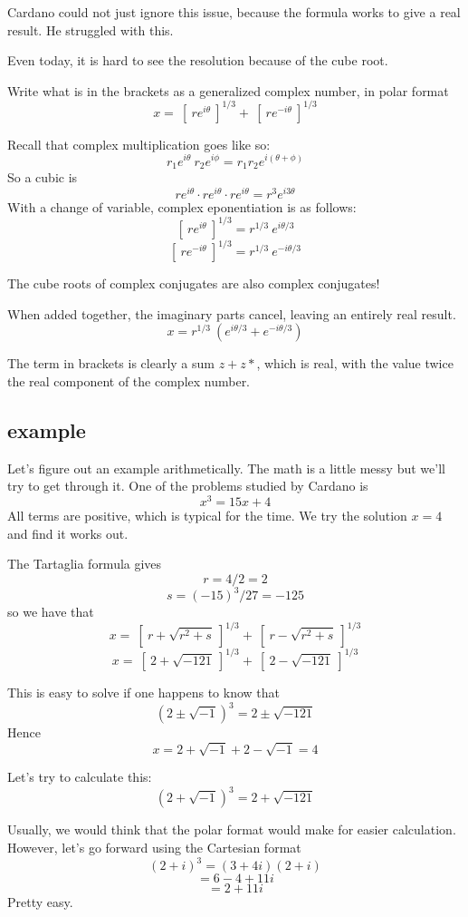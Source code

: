 \documentclass[11pt, oneside]{article}
\begin{document}
Cardano could not just ignore this issue, because the formula works to give a real result.  He struggled with this.  

Even today, it is hard to see the resolution because of the cube root.

Write what is in the brackets as a generalized complex number, in polar format
\[ x = \ [ \ re^{i\theta} \ ]^{1/3} + \ [ \ re^{-i\theta} \ ]^{1/3} \]

Recall that complex multiplication goes like so:
\[ r_1 e^{i\theta} \ r_2 e^{i\phi} = r_1 r_2 e^{i (\theta + \phi)} \]
So a cubic is
\[ r e^{i\theta} \cdot r e^{i\theta} \cdot r e^{i\theta} = r^3 e^{i3\theta}  \]
With a change of variable, complex eponentiation is as follows:
\[ [ \ re^{i\theta} \ ]^{1/3} = r^{1/3} \ e^{i \theta/3} \]
\[ [ \ re^{-i\theta} \ ]^{1/3} = r^{1/3} \ e^{-i \theta/3} \]

The cube roots of complex conjugates are also complex conjugates!

When added together, the imaginary parts cancel, leaving an entirely real result.
\[ x = r^{1/3} \  (e^{i \theta/3} + e^{-i \theta/3}) \]

The term in brackets is clearly a sum $z + z*$, which is real, with the value twice the real component of the complex number.

\subsection*{example}
Let's figure out an example arithmetically.  The math is a little messy but we'll try to get through it.  One of the problems studied by Cardano is
\[ x^3 = 15x + 4 \]
All terms are positive, which is typical for the time.  We try the solution $x = 4$ and find it works out.  

The Tartaglia formula gives
\[ r = 4/2 = 2 \]
\[ s = (-15)^3 / 27 = -125 \]
so we have that
\[ x = \ [ \ r + \sqrt{r^2 + s} \ ]^{1/3} + \ [ \ r - \sqrt{r^2 + s} \ ]^{1/3} \]
\[ x = \ [ \ 2 + \sqrt{-121} \ ]^{1/3} + \ [ \ 2 - \sqrt{-121} \ ]^{1/3} \]

This is easy to solve if one happens to know that
\[ (2 \pm \sqrt{-1})^3 = 2 \pm \sqrt{-121} \]
Hence 
\[ x = 2 + \sqrt{-1} + 2 - \sqrt{-1} = 4 \]

Let's try to calculate this:
\[ (2 + \sqrt{-1})^3 = 2 + \sqrt{-121} \]

Usually, we would think that the polar format would make for easier calculation.  However, let's go forward using the Cartesian format
\[ (2 + i)^3 = (3 + 4i)(2 + i) \]
\[ = 6 - 4 + 11i \]
\[ = 2 + 11i \]
Pretty easy.
\end{document}
